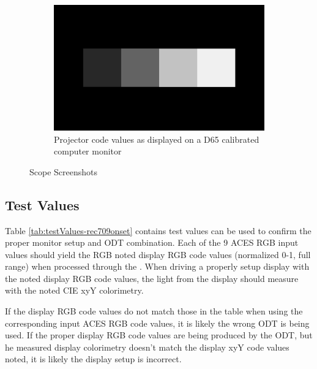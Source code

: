 \begin{figure}[ht!]
\begin{subfigure}[b]{0.475\textwidth}
            \includegraphics[width=\textwidth]{images/rec709/rec709_image}
            \caption[Projector code values as displayed on a D65 calibrated computer monitor]%
            {{\small Projector code values as displayed on a D65 calibrated computer monitor}}    
            \label{fig:cv-rec709onset}
        \end{subfigure}
        \caption[]
        {\small \texttt{} Scope Screenshots} 
        \label{fig:screenshots-rec709onset}
    \end{figure}

\subsection{Test Values}
\label{subsec:testValues-rec709onset}

Table \ref{tab:testValues-rec709onset} contains test values can be used to confirm the proper monitor setup and ODT combination.  Each of the 9 ACES RGB input values should yield the RGB noted display RGB code values (normalized 0-1, full range) when processed through the \texttt{}. When driving a properly setup display with the noted display RGB code values, the light from the display should measure with the noted CIE xyY colorimetry.  

If the display RGB code values do not match those in the table when using the corresponding input ACES RGB code values, it is likely the wrong ODT is being used.  If the proper display RGB code values are being produced by the ODT, but he measured display colorimetry doesn't match the display xyY code values noted, it is likely the display setup is incorrect.

